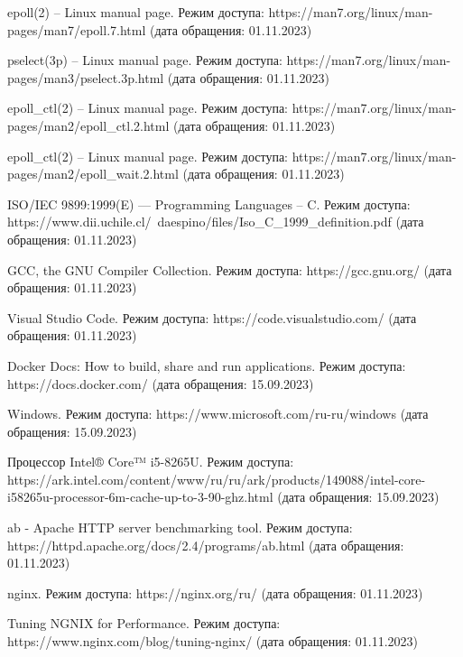 \begin{thebibliography}{}
	epoll(2) -- Linux manual page. Режим доступа: https://man7.org/linux/man-pages/man7/epoll.7.html (дата обращения: 01.11.2023)
	
	pselect(3p) -- Linux manual page. Режим доступа: https://man7.org/linux/man-pages/man3/pselect.3p.html (дата обращения: 01.11.2023)
	
	epoll\_ctl(2) -- Linux manual page. Режим доступа: https://man7.org/linux/man-pages/man2/epoll\_ctl.2.html (дата обращения: 01.11.2023)
	
	epoll\_ctl(2) -- Linux manual page. Режим доступа: https://man7.org/linux/man-pages/man2/epoll\_wait.2.html (дата обращения: 01.11.2023)
	
	ISO/IEC 9899:1999(E) --- Programming Languages -- C. Режим доступа: https://www.dii.uchile.cl/~daespino/files/Iso\_C\_1999\_definition.pdf (дата обращения: 01.11.2023)
	
	GCC, the GNU Compiler Collection. Режим доступа: https://gcc.gnu.org/ (дата обращения: 01.11.2023)
	
	Visual Studio Code. Режим доступа: https://code.visualstudio.com/ (дата обращения: 01.11.2023)
	
    Docker Docs: How to build, share and run applications. Режим доступа: https://docs.docker.com/ (дата обращения: 15.09.2023)
    
    Windows. Режим доступа: https://www.microsoft.com/ru-ru/windows (дата обращения: 15.09.2023)
    
    Процессор Intel® Core™ i5-8265U. Режим доступа: https://ark.intel.com/content/www/ru/ru/ark/products/149088/intel-core-i58265u-processor-6m-cache-up-to-3-90-ghz.html (дата обращения: 15.09.2023)
    
    ab - Apache HTTP server benchmarking tool. Режим доступа: https://httpd.apache.org/docs/2.4/programs/ab.html (дата обращения: 01.11.2023)
    
    nginx. Режим доступа: https://nginx.org/ru/ (дата обращения: 01.11.2023)
    
    Tuning NGNIX for Performance. Режим доступа: https://www.nginx.com/blog/tuning-nginx/ (дата обращения: 01.11.2023)
    
\end{thebibliography}
\endgroup

\pagebreak